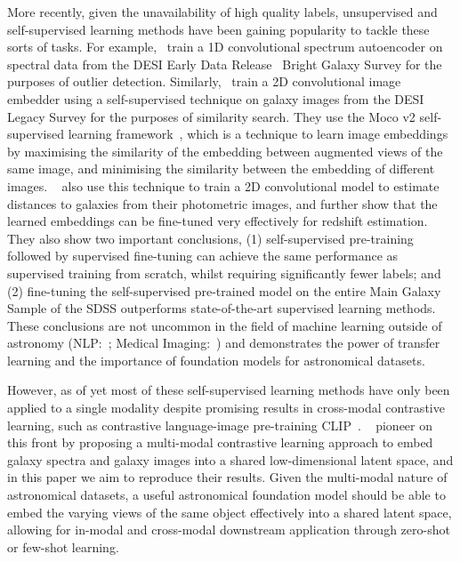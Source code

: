 More recently, given the unavailability of high quality labels, unsupervised and self-supervised learning methods have been
gaining popularity to tackle these sorts of tasks.
For example,~\cite{liang2023} train a 1D convolutional spectrum autoencoder on spectral data from the DESI Early Data
Release~\citep{desiearly2023} Bright Galaxy Survey for the purposes of outlier detection.
Similarly,~\cite{stein2021} train a 2D convolutional image embedder using a self-supervised technique on galaxy images
from the DESI Legacy Survey for the purposes of similarity search.
They use the Moco v2 self-supervised learning framework~\citep{moco2020, mocov22020}, which is a technique to learn image embeddings
by maximising the similarity of the embedding between augmented views of the same image, and minimising the similarity between
the embedding of different images.
~\cite{hayat2021} also use this technique to train a 2D convolutional model to estimate distances to galaxies from their
photometric images, and further show that the learned embeddings can be fine-tuned very effectively for redshift estimation.
They also show two important conclusions, (1) self-supervised pre-training followed by supervised fine-tuning can achieve
the same performance as supervised training from scratch, whilst requiring significantly fewer labels; and (2) fine-tuning
the self-supervised pre-trained model on the entire Main Galaxy Sample of the SDSS outperforms state-of-the-art supervised
learning methods.
These conclusions are not uncommon in the field of machine learning outside of astronomy
(NLP:~\cite{devlin2019, radford2018}; Medical Imaging:~\cite{shin2016}) and demonstrates the power of transfer learning
and the importance of foundation models for astronomical datasets.

However, as of yet most of these self-supervised learning methods have only been applied to a single modality despite
promising results in cross-modal contrastive learning, such as contrastive language-image pre-training CLIP~\citep{radford2021}.
~\cite{astroclip} pioneer on this front by proposing a multi-modal contrastive learning approach to embed galaxy spectra
and galaxy images into a shared low-dimensional latent space, and in this paper we aim to reproduce their results.
Given the multi-modal nature of astronomical datasets, a useful astronomical foundation model should be able to embed
the varying views of the same object effectively into a shared latent space, allowing for in-modal and cross-modal downstream
application through zero-shot or few-shot learning.

